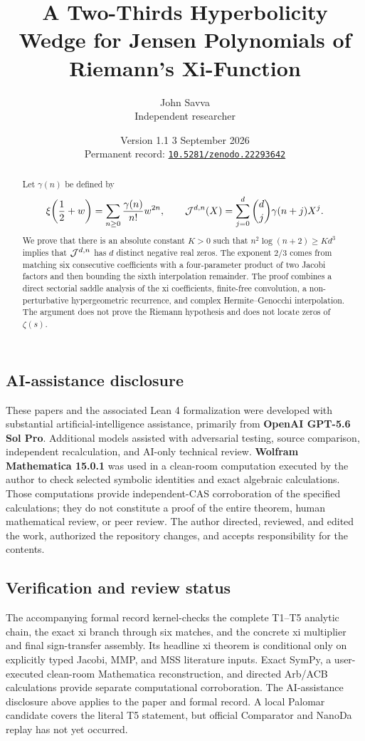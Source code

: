 \documentclass[12pt]{article}
\title{A Two-Thirds Hyperbolicity Wedge for Jensen Polynomials of Riemann's Xi-Function}
\author{John Savva\\{\small Independent researcher}}
\date{Version 1.1 \textemdash{} 3 September 2026\\{\small Permanent record: \href{https://doi.org/10.5281/zenodo.22293642}{\texttt{10.5281/zenodo.22293642}}}}
\begin{document}
\maketitle

\begin{abstract}
Let $\gamma(n)$ be defined by
\[
  \xi\!\left(\frac12+w\right)
  =\sum_{n\ge0}\frac{\gamma(n)}{n!}w^{2n},
\qquad
  \mathcal J^{d,n}(X)=\sum_{j=0}^{d}\binom dj\gamma(n+j)X^j.
\]
We prove that there is an absolute constant $K>0$ such that
$n^2\log(n+2)\ge Kd^3$ implies that $\mathcal J^{d,n}$ has $d$ distinct
negative real zeros.  The exponent $2/3$ comes from matching six consecutive
coefficients with a four-parameter product of two Jacobi factors and then
bounding the sixth interpolation remainder.  The proof combines a direct
sectorial saddle analysis of the xi coefficients, finite-free convolution,
a non-perturbative hypergeometric recurrence, and complex
Hermite--Genocchi interpolation.  The argument does not prove the Riemann
hypothesis and does not locate zeros of $\zeta(s)$.

\end{abstract}
\subsection*{AI-assistance disclosure}
These papers and the associated Lean 4 formalization were developed with
substantial artificial-intelligence assistance, primarily from
\textbf{OpenAI GPT-5.6 Sol Pro}.  Additional models assisted with adversarial
testing, source comparison, independent recalculation, and AI-only technical
review.  \textbf{Wolfram Mathematica 15.0.1} was used in a clean-room
computation executed by the author to check selected symbolic identities and
exact algebraic calculations.  Those computations provide independent-CAS
corroboration of the specified calculations; they do not constitute a proof
of the entire theorem, human mathematical review, or peer review.  The author
directed, reviewed, and edited the work, authorized the repository changes,
and accepts responsibility for the contents.


\subsection*{Verification and review status}
The accompanying formal record kernel-checks the complete T1--T5 analytic
chain, the exact xi branch through six matches, and the concrete xi
multiplier and final sign-transfer assembly.  Its headline xi theorem is
conditional only on explicitly typed Jacobi, MMP, and MSS literature inputs.
Exact SymPy, a user-executed clean-room Mathematica reconstruction, and
directed Arb/ACB calculations provide separate computational corroboration.
The AI-assistance disclosure above applies to the paper and formal record.
A local Palomar candidate covers the literal T5 statement, but official
Comparator and NanoDa replay has not yet occurred.
\end{document}

